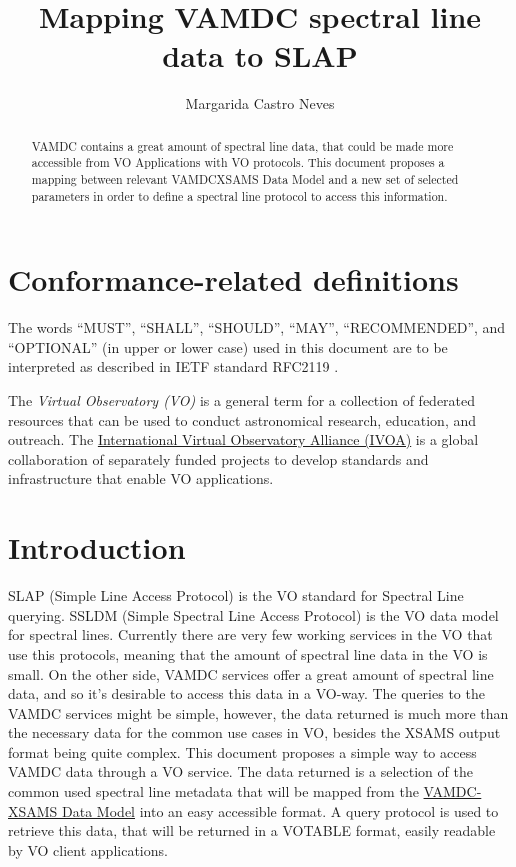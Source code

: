 \documentclass[11pt,a4paper]{ivoa}
\title{Mapping VAMDC spectral line data to SLAP}
\author{Margarida Castro Neves}
\begin{document}
\begin{abstract}
VAMDC contains  a great amount of spectral line data, that could be made more
accessible from VO Applications with VO protocols. This document proposes a mapping 
between relevant VAMDCXSAMS Data Model and a new set of selected parameters  in 
order to define a spectral line protocol to access this information.


\end{abstract}




\section*{Conformance-related definitions}

The words ``MUST'', ``SHALL'', ``SHOULD'', ``MAY'', ``RECOMMENDED'', and
``OPTIONAL'' (in upper or lower case) used in this document are to be
interpreted as described in IETF standard RFC2119 \citep{std:RFC2119}.

The \emph{Virtual Observatory (VO)} is a
general term for a collection of federated resources that can be used
to conduct astronomical research, education, and outreach.
The \href{http://www.ivoa.net}{International
Virtual Observatory Alliance (IVOA)} is a global
collaboration of separately funded projects to develop standards and
infrastructure that enable VO applications.


\section{Introduction}

SLAP (Simple Line Access Protocol)\citep{2010ivoa.specQ1209O} is the VO standard for Spectral Line querying. SSLDM (Simple Spectral Line Access Protocol)\citep{2010ivoa.spec.1209O} is the VO data model for spectral lines.
Currently there are very few working services in the VO that use this protocols, meaning that the amount of spectral line data in the VO is small. 
On the other side, VAMDC services offer a great amount of spectral line data, and  so it's desirable to access this data in a VO-way. 
The queries to the VAMDC services might be simple, however, the data returned is much more than the necessary data for the common use cases in VO, besides the XSAMS \citep{XSAMS:Docs} output format being quite complex.
This document proposes a simple way to access VAMDC data through a VO service. The data returned is a selection of the common used spectral line metadata that will be mapped from the \href{https://standards.vamdc.eu/#data-model}{VAMDC-XSAMS Data Model} into an easy accessible format. A query protocol is used  to retrieve this data,  that will be returned in a VOTABLE format, easily readable by VO client applications.
\end{document}
